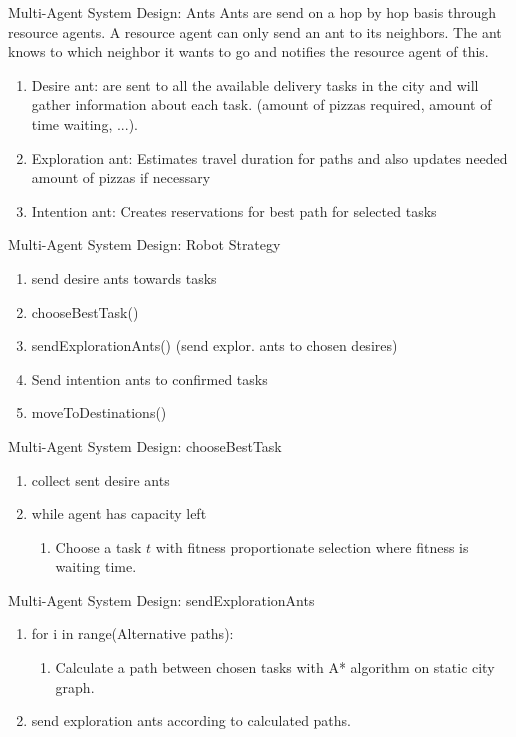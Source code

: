 \begin{frame}{Multi-Agent System Design: Ants}
Ants are send on a hop by hop basis through resource agents.
A resource agent can only send an ant to its neighbors.
The ant knows to which neighbor it wants to go and notifies the resource agent of this.
\begin{enumerate}
\item Desire ant: are sent to all the available delivery tasks in the city and will gather information about each task. (amount of pizzas required, amount of time waiting, ...).
\item Exploration ant: Estimates travel duration for paths and also updates needed amount of pizzas if necessary
\item Intention ant: Creates reservations for best path for selected tasks
\end{enumerate}
\end{frame}

\begin{frame}{Multi-Agent System Design: Robot Strategy}
\begin{enumerate}
	\item send desire ants towards tasks
	\item chooseBestTask()
	\item sendExplorationAnts() (send explor. ants to chosen desires)
	\item Send intention ants to confirmed tasks
	\item moveToDestinations()
\end{enumerate}
\end{frame}

\begin{frame}{Multi-Agent System Design: chooseBestTask}
	\begin{enumerate}
		\item collect sent desire ants
		\item while agent has capacity left
		\begin{enumerate}
		\item Choose a task $t$ with fitness proportionate selection where fitness is waiting time.
		\end{enumerate}
		\end{enumerate}
\end{frame}

\begin{frame}{Multi-Agent System Design: sendExplorationAnts}
	\begin{enumerate}
		\item for i in range(Alternative paths):
		\begin{enumerate}
			\item Calculate a path between chosen tasks with A* algorithm on static city graph.
		\end{enumerate}
		\item send exploration ants according to calculated paths.
	\end{enumerate}
\end{frame}

